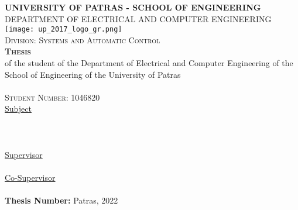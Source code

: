 \pagestyle{empty}

\begin{titlepage}
\begin{center}
\textsc{\textbf{\large UNIVERSITY OF PATRAS - SCHOOL OF ENGINEERING}\\
\large DEPARTMENT OF ELECTRICAL AND COMPUTER ENGINEERING}\\

\texttt{[image: up\_2017\_logo\_gr.png]}\\  

\textsc{Division: \large Systems and Automatic Control}\\[1cm]

\textsc{\textbf{\LARGE{Thesis}}}\\ [0.5cm]
of the student of the Department of Electrical and Computer Engineering of the School of Engineering of the University of Patras\\[0.5cm]

\textsc{\Large \me }\\[0.5cm]
\textsc{\large Student Number: 1046820}\\[1cm]

\underline{\large Subject}\\
\HRule \\[0.4cm]
{\huge \bfseries \thesistitle }\\[0.4cm] %
\HRule \\[1.5cm]

\underline{\large Supervisor}\\[0.5cm]
\large \suptitle \, \supname \\[1cm]
\underline{\large Co-Supervisor}\\[0.5cm]
\large \cosuptitle \, \cosupname \\[1cm]
\textbf{Thesis Number:}
\vfill
\large{Patras, 2022}
\end{center}
\end{titlepage}
